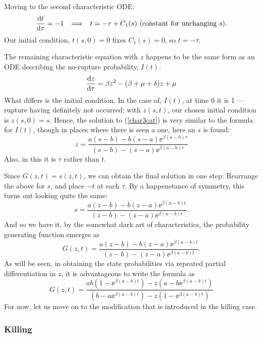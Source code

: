 \noindent
Moving to the second characteristic ODE:
$$\displaystyle\frac{{\rm d} t}{{\rm d} \tau} = -1 \hspace{5pt} \implies \hspace{5pt} t = -\tau +  C_1(s) \text{  (constant for unchanging }s ).$$
Our initial condition, $t(s,0) = 0$ fixes $C_1(s) = 0$, so $t = -\tau$.\par
The remaining characteristic equation with $z$ happens to be the same form as an ODE describing the no-rupture probability, $I(t)$. 
\begin{equation}
\label{char3cat}
\displaystyle\frac{{\rm d} z}{{\rm d} \tau} = \beta z^2 - (\beta + \mu + \delta)z + \mu
\end{equation}
What differs is the initial condition. In the case of, $I(t)$, at time 0 it is 1 --- rupture having definitely not occurred; with $z(s,t)$, our chosen initial condition is $z(s, 0) = s$. Hence, the solution to (\ref{char3cat}) is very similar to the formula for $I(t)$, though in places where there is seen a one, here an $s$ is found:
\begin{equation*}
z = \frac{a(s-b) - b(s-a)\ee^{\beta(a-b) \tau} } {(s-b) - (s-a)\ee^{\beta(a-b) \tau}}
\end{equation*}
Also, in this it is $\tau$ rather than $t$.\par
Since $G(z, t) = s(z, t)$, we can obtain the final solution in one step: Rearrange the above for $s$, and place $-t$ at each $\tau$. By a happenstance of symmetry, this turns out looking quite the same:
\begin{equation}
\label{s2343}
s = \frac{a(z-b) - b(z-a)\ee^{\beta(a-b) t} } {(z-b) - (z-a)\ee^{\beta(a-b) t}}.
\end{equation}
And so we have it, by the somewhat dark art of characteristics, the probability generating function emerges as
\begin{equation*}
G(z,t) = \frac{a(z-b) - b(z-a)\ee^{\beta(a-b) t} } {(z-b) - (z-a)\ee^{\beta(a-b) t}}.
\end{equation*}
As will be seen, in obtaining the state probabilities via repeated partial differentiation in $z$, it is advantageous to write the formula as
\begin{equation*}
G(z,t) = \frac{ab(1-\ee^{\beta(a-b) t}) - z(a-b\ee^{\beta(a-b) t}) } {  (b-a\ee^{\beta(a-b) t}) -z(1-\ee^{\beta(a-b) t})  }
\end{equation*}
For now, let us move on to the modification that is introduced in the killing case. 


\subsubsection*{Killing}

